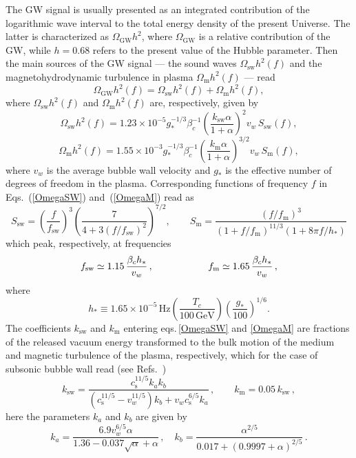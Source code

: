 \documentclass[12pt]{article}
\def\sw{\text{sw}}
\def\m{\text{m}}
\def\s{\text{s}}
\begin{document}
The GW signal is usually presented as an integrated  contribution  
 of the logarithmic wave interval to the total energy density of the present
Universe. The latter is characterized as $\Omega_{\text{GW}} h^2$,
where $\Omega_{\text{GW}}$ is a relative contribution of the GW, while
$h=0.68$ refers to the present value of the Hubble
parameter. Then the main sources of the GW signal ---
the sound waves $\Omega_{\text{sw}} h^2(f)$ and the
magnetohydrodynamic turbulence in plasma $\Omega_{\text{m}} h^2(f)$ 
--- read  
\begin{equation}
\Omega_{\text{GW}} h^2(f) =  \Omega_{\text{sw}} h^2(f)+\Omega_{\text{m}} h^2(f),
\end{equation}  
where $\Omega_{\text{sw}} h^2(f)$ and $\Omega_{\text{m}} h^2(f)$
are, respectively, given by~\cite{Caprini:2015zlo} 
\begin{equation}
\Omega_{\text{sw}} h^2(f) = 1.23\times 10^{-5} g_*^{-1/3} \beta_c^{-1}
\left( \frac{k_{\text{sw}}  \alpha}{1+\alpha}\right)^2 v_w\, S_{\text{sw}}(f), \label{OmegaSW}
\end{equation}
\begin{equation}
\Omega_{\text{m}} h^2(f) = 1.55\times 10^{-3} g_*^{-1/3} \beta_c^{-1}
\left( \frac{k_{\text{m}}  \alpha}{1+\alpha}\right)^{3/2} v_w\, S_{\text{m}}(f), \label{OmegaM}
\end{equation}
where $v_w$ is the average bubble wall velocity and $g_*$ is the
effective number of degrees of freedom in the plasma. 
Corresponding functions of frequency $f$ in Eqs.~(\ref{OmegaSW}) 
and~(\ref{OmegaM})  read as   
\begin{equation}
\label{spectra}
  S_{\text{sw}}=\left(\frac{f}{f_{\text{sw}}}\right)^3
\left(\frac{7}{4+3 (f/f_{\text{sw}})^2}\right)^{7/2}, \qquad 
S_{\text{m}}=\frac{(f/f_{\text{m}})^3}{(1+f/f_{\text{m}})^{11/3} (1+8 \pi f/h_*) }
\end{equation}       
which peak, respectively, at frequencies  
\begin{equation}
f_{\text{sw}}\simeq 1.15\,\frac{\beta_c h_*}{v_w}\,, \hskip2cm f_{\text{m}} \simeq 1.65\, \frac{\beta_c h_*}{v_w}\,,  
\end{equation}
where 
\begin{equation}
h_* \equiv 1.65\times 10^{-5}\,\mbox{Hz}\left(\frac{T_c}{100\,\mbox{GeV}}\right)\left(\frac{g_*}{100}\right)^{1/6}.  
\end{equation}
The coefficients $k_{\text{sw}}$ and $k_{\text{m}}$ entering
eqs.\,\eqref{OmegaSW} and \eqref{OmegaM} are 
fractions of the 
released vacuum energy transformed to the bulk motion
of the medium and magnetic turbulence of the plasma, respectively,
which for the case of subsonic bubble wall read (see
Refs.~\cite{Espinosa:2010hh,Caprini:2015zlo})  
\begin{equation}
k_{\text{sw}} = 
\frac{c_\s^{11/5} k_a k_b}{ \left(c_\s^{11/5} - v_w^{11/5} 
 \right)k_b +v_w c_\s^{6/5} k_a}\,, \qquad k_\m = 0.05\, k_\sw\,, 
\end{equation}
here the parameters  $k_a$ and $k_b$ are given by 
\begin{equation}
k_a= \frac{6.9 v^{6/5}_w \alpha}{1.36-0.037 \sqrt{\alpha}+\alpha}\,,
\quad k_b= \frac{ \alpha^{2/5}}{0.017 +(0.9997+\alpha)^{2/5}}\,.
\end{equation} 
\end{document}
